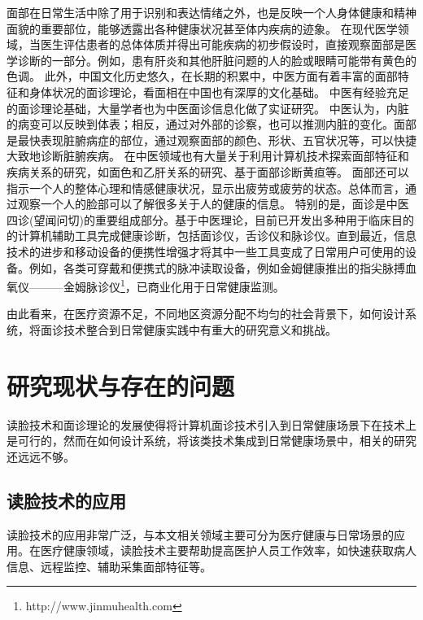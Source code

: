 面部在日常生活中除了用于识别和表达情绪之外，也是反映一个人身体健康和精神面貌的重要部位，能够透露出各种健康状况甚至体内疾病的迹象。
在现代医学领域，当医生评估患者的总体体质并得出可能疾病的初步假设时，直接观察面部是医学诊断的一部分\cite{Clifford2006Shortliffe}。例如，患有肝炎和其他肝脏问题的人的脸或眼睛可能带有黄色的色调\cite{Li2008Therapeutic}。
此外，中国文化历史悠久，在长期的积累中，中医方面有着丰富的面部特征和身体状况的面诊理论，看面相在中国也有深厚的文化基础。
中医有经验充足的面诊理论基础，大量学者也为中医面诊信息化做了实证研究。
中医认为，内脏的病变可以反映到体表；相反，通过对外部的诊察，也可以推测内脏的变化\cite{杨淑芳2002伤寒六经辨证初探}。面部是最快表现脏腑病症的部位，通过观察面部的颜色、形状、五官状况等，可以快捷大致地诊断脏腑疾病。
在中医领域也有大量关于利用计算机技术探索面部特征和疾病关系的研究，如面色和乙肝关系的研究\cite{杨宏志2007慢性乙型肝炎肝硬化中医面部五色诊断与临床病理的相关性研究}、基于面部诊断黄疸\cite{艾英1998黄疸病人面部色泽定量实验研究}等。
面部还可以指示一个人的整体心理和情感健康状况，显示出疲劳或疲劳的状态。总体而言，通过观察一个人的脸部可以了解很多关于人的健康的信息。
特别的是，面诊是中医四诊(望闻问切)的重要组成部分。基于中医理论，目前已开发出多种用于临床目的的计算机辅助工具完成健康诊断，包括面诊仪\cite{Liu2014Computerized}，舌诊仪\cite{Wang2004An}和脉诊仪\cite{Shu2007Developing}。直到最近，信息技术的进步和移动设备的便携性增强才将其中一些工具变成了日常用户可使用的设备。例如，各类可穿戴和便携式的脉冲读取设备，例如金姆健康推出的指尖脉搏血氧仪———金姆脉诊仪\footnote{http://www.jinmuhealth.com}，已商业化用于日常健康监测。

由此看来，在医疗资源不足，不同地区资源分配不均匀\cite{雷鹏中国医疗资源配置与服务利用现状评价}的社会背景下，如何设计系统，将面诊技术整合到日常健康实践中有重大的研究意义和挑战。

\section{研究现状与存在的问题}

读脸技术和面诊理论的发展使得将计算机面诊技术引入到日常健康场景下在技术上是可行的，然而在如何设计系统，将该类技术集成到日常健康场景中，相关的研究还远远不够。

\subsection{读脸技术的应用}
读脸技术的应用非常广泛，与本文相关领域主要可分为医疗健康与日常场景的应用。在医疗健康领域，读脸技术主要帮助提高医护人员工作效率，如快速获取病人信息\cite{nwosu2016mobile}、远程监控\cite{Hossain2015Cloud}、辅助采集面部特征\cite{张红凯2015中医面诊信息采集与识别方法研究进展}等。

